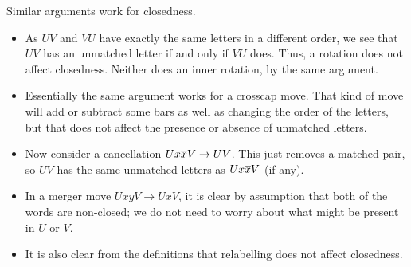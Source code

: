 \documentclass[a4paper]{amsart}
\begin{document}
\begin{solution}
 Similar arguments work for closedness.
 \begin{itemize}
  \item As $UV$ and $VU$ have exactly the same letters in a different
   order, we see that $UV$ has an unmatched letter if and only
   if $VU$ does.  Thus, a rotation does not affect closedness.
   Neither does an inner rotation, by the same argument.
  \item Essentially the same argument works for a crosscap move.  That
   kind of move will add or subtract some bars as well as changing the
   order of the letters, but that does not affect the presence or
   absence of unmatched letters.
  \item Now consider a cancellation $Ux\overline{x} V\to UV$.  This just
   removes a matched pair, so $UV$ has the same unmatched letters as
   $Ux\overline{x} V$ (if any).
  \item In a merger move $UxyV\to UxV$, it is clear by assumption that
   both of the words are non-closed; we do not need to worry about
   what might be present in $U$ or $V$. 
  \item It is also clear from the definitions that relabelling does
   not affect closedness.
 \end{itemize}
\end{solution}
\end{document}
